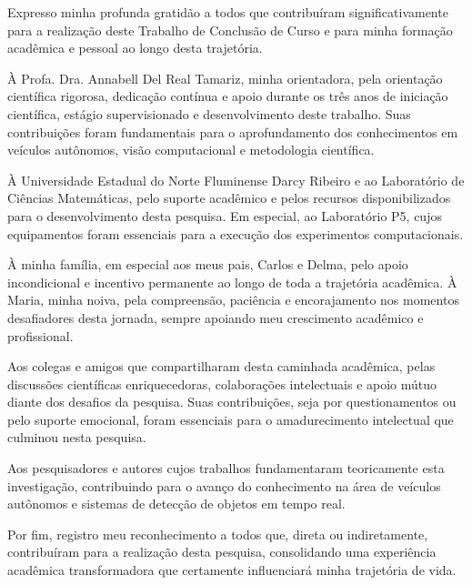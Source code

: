 \documentclass[
	12pt,				%
	oneside, %
	a4paper,			%
	english,			%
	french,				%
	spanish,			%
	brazil				%
	]{abntex2}
\begin{document}


\begin{agradecimentos}

Expresso minha profunda gratidão a todos que contribuíram significativamente para a realização deste Trabalho de Conclusão de Curso e para minha formação acadêmica e pessoal ao longo desta trajetória.

À Profa. Dra. Annabell Del Real Tamariz, minha orientadora, pela orientação científica rigorosa, dedicação contínua e apoio durante os três anos de iniciação científica, estágio supervisionado e desenvolvimento deste trabalho. Suas contribuições foram fundamentais para o aprofundamento dos conhecimentos em veículos autônomos, visão computacional e metodologia científica.

À Universidade Estadual do Norte Fluminense Darcy Ribeiro e ao Laboratório de Ciências Matemáticas, pelo suporte acadêmico e pelos recursos disponibilizados para o desenvolvimento desta pesquisa. Em especial, ao Laboratório P5, cujos equipamentos foram essenciais para a execução dos experimentos computacionais.

À minha família, em especial aos meus pais, Carlos e Delma, pelo apoio incondicional e incentivo permanente ao longo de toda a trajetória acadêmica. À Maria, minha noiva, pela compreensão, paciência e encorajamento nos momentos desafiadores desta jornada, sempre apoiando meu crescimento acadêmico e profissional.

Aos colegas e amigos que compartilharam desta caminhada acadêmica, pelas discussões científicas enriquecedoras, colaborações intelectuais e apoio mútuo diante dos desafios da pesquisa. Suas contribuições, seja por questionamentos ou pelo suporte emocional, foram essenciais para o amadurecimento intelectual que culminou nesta pesquisa.

Aos pesquisadores e autores cujos trabalhos fundamentaram teoricamente esta investigação, contribuindo para o avanço do conhecimento na área de veículos autônomos e sistemas de detecção de objetos em tempo real.

Por fim, registro meu reconhecimento a todos que, direta ou indiretamente, contribuíram para a realização desta pesquisa, consolidando uma experiência acadêmica transformadora que certamente influenciará minha trajetória de vida.

\end{agradecimentos}
\end{document}
